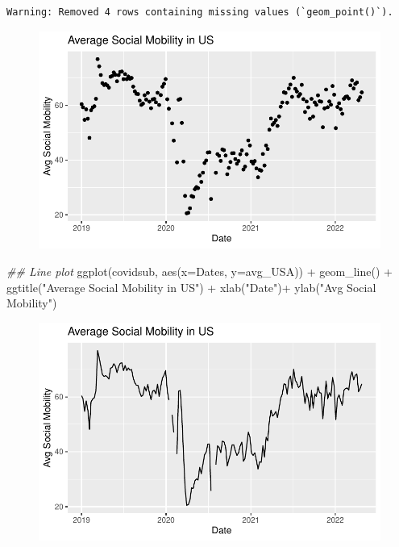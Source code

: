\documentclass[
  letterpaper,
  DIV=11,
  numbers=noendperiod]{scrreprt}
\newenvironment{Shaded}{\begin{snugshade}}{\end{snugshade}}
\newcommand{\AttributeTok}[1]{\textcolor[rgb]{0.40,0.45,0.13}{#1}}
\newcommand{\DocumentationTok}[1]{\textcolor[rgb]{0.37,0.37,0.37}{\textit{#1}}}
\newcommand{\FunctionTok}[1]{\textcolor[rgb]{0.28,0.35,0.67}{#1}}
\newcommand{\NormalTok}[1]{\textcolor[rgb]{0.00,0.23,0.31}{#1}}
\newcommand{\SpecialCharTok}[1]{\textcolor[rgb]{0.37,0.37,0.37}{#1}}
\newcommand{\StringTok}[1]{\textcolor[rgb]{0.13,0.47,0.30}{#1}}
\begin{document}
\begin{verbatim}
Warning: Removed 4 rows containing missing values (`geom_point()`).
\end{verbatim}

\begin{figure}[H]

{\centering \includegraphics{04-Visualization_files/figure-pdf/unnamed-chunk-50-1.pdf}

}

\end{figure}

\begin{Shaded}
\begin{Highlighting}[]
\DocumentationTok{\#\# Line plot}
\FunctionTok{ggplot}\NormalTok{(covidsub, }\FunctionTok{aes}\NormalTok{(}\AttributeTok{x=}\NormalTok{Dates, }\AttributeTok{y=}\NormalTok{avg\_USA)) }\SpecialCharTok{+}
  \FunctionTok{geom\_line}\NormalTok{() }\SpecialCharTok{+}
  \FunctionTok{ggtitle}\NormalTok{(}\StringTok{"Average Social Mobility in US"}\NormalTok{) }\SpecialCharTok{+}
  \FunctionTok{xlab}\NormalTok{(}\StringTok{"Date"}\NormalTok{)}\SpecialCharTok{+}
  \FunctionTok{ylab}\NormalTok{(}\StringTok{"Avg Social Mobility"}\NormalTok{)}
\end{Highlighting}
\end{Shaded}

\begin{figure}[H]

{\centering \includegraphics{04-Visualization_files/figure-pdf/unnamed-chunk-50-2.pdf}

}

\end{figure}
\end{document}
